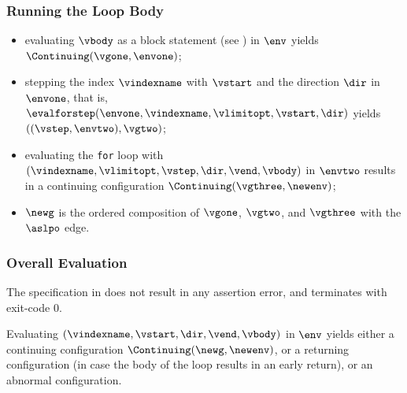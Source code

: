 \subsubsection{Running the Loop Body}
\AllApply
\begin{itemize}
  \item evaluating $\vbody$ as a block statement (see ) in $\env$
        yields \\ $\Continuing(\vgone, \envone)$\ProseTerminateAs{\ReturningConfig, \ThrowingConfig, \DynErrorConfig};
  \item stepping the index $\vindexname$ with $\vstart$ and the direction $\dir$ in $\envone$,
        that is, $\evalforstep(\envone, \vindexname, \vlimitopt, \vstart, \dir)$ yields \\
        $((\vstep, \envtwo), \vgtwo)$;
  \item evaluating the \texttt{for} loop with $(\vindexname, \vlimitopt, \vstep, \dir, \vend, \vbody)$
        in $\envtwo$ results in a continuing configuration $\Continuing(\vgthree, \newenv)$\ProseTerminateAs{\ReturningConfig, \ThrowingConfig, \DynErrorConfig};
  \item $\newg$ is the ordered composition of $\vgone$, $\vgtwo$, and $\vgthree$ with the $\aslpo$
        edge.
\end{itemize}

\subsubsection{Overall Evaluation}
The specification in 
does not result in any assertion error, and terminates with exit-code $0$.

Evaluating $(\vindexname, \vstart, \dir, \vend, \vbody)$ in $\env$ yields either
a continuing configuration $\Continuing(\newg, \newenv)$, or a returning configuration
(in case the body of the loop results in an early return),
or an abnormal configuration.

